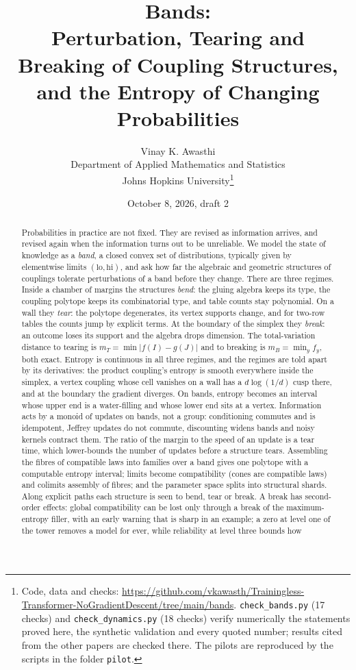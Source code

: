 \documentclass[11pt]{article}
\title{Bands:\\
Perturbation, Tearing and Breaking of Coupling Structures,\\ and the Entropy of Changing Probabilities}
\author{Vinay K. Awasthi\\
Department of Applied Mathematics and Statistics\\
Johns Hopkins University\thanks{Code, data and checks: \url{https://github.com/vkawasth/Trainingless-Transformer-NoGradientDescent/tree/main/bands}. \texttt{check\_bands.py} (17 checks) and \texttt{check\_dynamics.py} (18 checks) verify numerically the statements proved here, the synthetic
validation and every quoted number; results cited from the other papers are checked there. The pilots are reproduced by the
scripts in the folder \texttt{pilot}.}}
\date{October 8, 2026, draft 2}
\theoremstyle{definition}
\theoremstyle{remark}
\begin{document}
\maketitle

\begin{abstract}
Probabilities in practice are not fixed. They are revised as information arrives, and revised again when the information
turns out to be unreliable. We model the state of knowledge as a \emph{band}, a closed convex set of distributions, typically
given by elementwise limits $(\mathrm{lo},\mathrm{hi})$, and ask how far the algebraic and geometric structures of couplings
tolerate perturbations of a band before they change. There are three regimes. Inside a chamber of margins the structures
\emph{bend}: the gluing algebra keeps its type, the coupling polytope keeps its combinatorial type, and table counts stay
polynomial. On a wall they \emph{tear}: the polytope degenerates, its vertex supports change, and for two-row tables the
counts jump by explicit terms. At the boundary of the
simplex they \emph{break}: an outcome loses its support and the algebra drops dimension. The total-variation distance to
tearing is $m_T=\min\lvert f(I)-g(J)\rvert$ and to breaking is $m_B=\min_y f_y$, both exact. Entropy is continuous in all three
regimes, and the regimes are told apart by its derivatives: the product coupling's entropy is smooth everywhere inside
the simplex, a vertex coupling whose cell vanishes on a wall has a $d\log(1/d)$ cusp there, and at the boundary the gradient
diverges. On bands, entropy becomes an interval whose upper end is a water-filling and whose lower end sits at a vertex.
Information acts by a monoid of updates on bands, not a group: conditioning commutes and is idempotent, Jeffrey updates do not
commute, discounting widens bands and noisy kernels contract them. The ratio of the margin to the speed of an update is a
tear time, which lower-bounds the number of updates before a structure tears. Assembling the fibres of compatible laws into families
over a band gives one polytope with a computable entropy interval; limits become compatibility (cones are compatible laws) and colimits
assembly of fibres; and the
parameter space splits into structural shards. Along explicit paths each structure is seen to bend, tear or break. A break has
second-order effects: global compatibility can be lost only through a break of the maximum-entropy filler, with an early warning
that is sharp in an example; a zero at level one of the tower removes a model for ever, while reliability at level three bounds how

\end{abstract}
\end{document}
